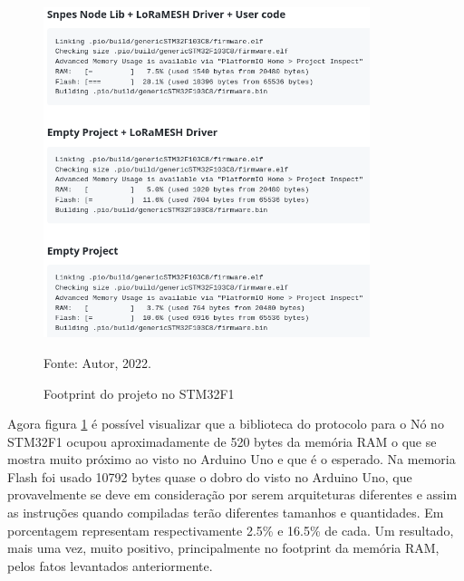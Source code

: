 \begin{figure}[H]
    \centering
	\caption{Footprint do projeto no STM32F1}
    \includegraphics[width=0.85\textwidth,keepaspectratio]{img/foot-stm.png}
    \label{fig:foot-stm}
    
    Fonte: Autor, 2022.
\end{figure}

Agora figura \ref{fig:foot-stm} é possível visualizar que a biblioteca do protocolo
para o Nó no STM32F1 ocupou aproximadamente de 520 bytes da memória RAM o que se
mostra muito próximo ao visto no Arduino Uno e que é o esperado. Na memoria Flash
foi usado 10792 bytes quase o dobro do visto no Arduino Uno, que provavelmente
se deve em consideração por serem arquiteturas diferentes e assim as instruções
quando compiladas terão diferentes tamanhos e quantidades. Em porcentagem 
representam respectivamente 2.5\%
e 16.5\% de cada. Um resultado, mais uma vez, muito positivo, principalmente
no footprint da memória RAM, pelos fatos levantados anteriormente.

